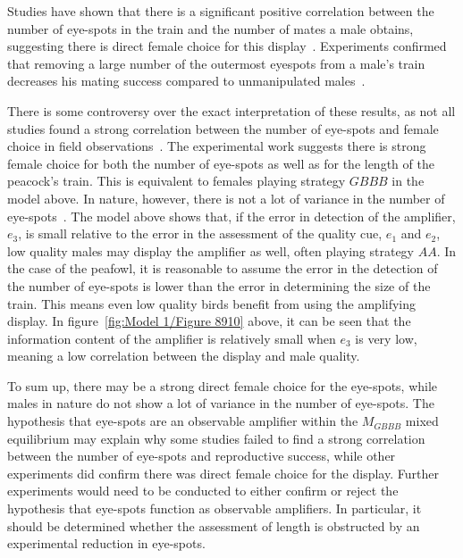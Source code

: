 \documentclass[a4paper,12pt]{article}
\numberwithin{equation}{section}
\begin{document}
Studies have shown that there is a significant positive correlation between the number of eye-spots in the train and the number of mates a male obtains, suggesting there is direct female choice for this display~\cite{Petrie1991, Loyau2005}. Experiments confirmed that removing a large number of the outermost eyespots from a male's train decreases his mating success compared to unmanipulated males~\cite{Petrie1994, Dakin2011}.

There is some controversy over the exact interpretation of these results, as not all studies found a strong correlation between the number of eye-spots and female choice in field observations~\cite{Takahashi2008, Loyau2008, Dakin2011}. The experimental work suggests there is strong female choice for both the number of eye-spots as well as for the length of the peacock's train. This is equivalent to females playing strategy $GBBB$ in the model above. In nature, however, there is not a lot of variance in the number of eye-spots~\cite{Dakin2011}. The model above shows that, if the error in detection of the amplifier, $e_{3}$, is small relative to the error in the assessment of the quality cue, $e_{1}$ and $e_{2}$, low quality males may display the amplifier as well, often playing strategy $AA$. In the case of the peafowl, it is reasonable to assume the error in the detection of the number of eye-spots is lower than the error in determining the size of the train. This means even low quality birds benefit from using the amplifying display. In figure~\ref{fig:Model 1/Figure 8910} above, it can be seen that the information content of the amplifier is relatively small when $e_{3}$ is very low, meaning a low correlation between the display and male quality.

To sum up, there may be a strong direct female choice for the eye-spots, while males in nature do not show a lot of variance in the number of eye-spots. The hypothesis that eye-spots are an observable amplifier within the $M_{GBBB}$ mixed equilibrium may explain why some studies failed to find a strong correlation between the number of eye-spots and reproductive success, while other experiments did confirm there was direct female choice for the display. Further experiments would need to be conducted to either confirm or reject the hypothesis that eye-spots function as observable amplifiers. In particular, it should be determined whether the assessment of length is obstructed by an experimental reduction in eye-spots.

\newpage\clearpage
\end{document}
